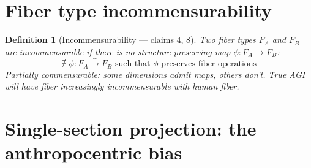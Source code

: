 \documentclass[11pt,a4paper]{article}
\newtheorem{definition}{Definition}[section]
\begin{document}
\section{Fiber type incommensurability}

\begin{definition}[Incommensurability --- claims 4, 8]
Two fiber types $F_A$ and $F_B$ are \emph{incommensurable} if there is
no structure-preserving map $\phi: F_A \to F_B$:
\[
  \nexists\; \phi: F_A \xrightarrow{\sim} F_B \text{ such that }
  \phi \text{ preserves fiber operations}
\]
Partially commensurable: some dimensions admit maps, others don't.
True AGI will have fiber increasingly incommensurable with human fiber.
\end{definition}


\section{Single-section projection: the anthropocentric bias}
\label{sec:bias}
\end{document}
